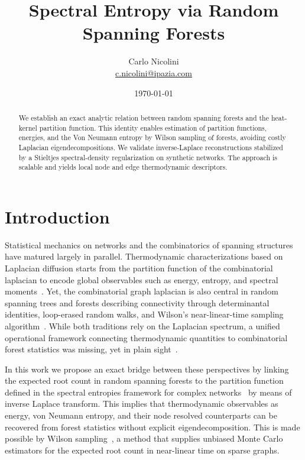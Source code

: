 \documentclass[10pt,aps,pre,twocolumn,nofootinbib,superscriptaddress,longbibliography]{revtex4-2}
\begin{document}
\title{Spectral Entropy via Random Spanning Forests}
\author{Carlo Nicolini\\\url{c.nicolini@ipazia.com}}
\date{\today}
\begin{abstract}
We establish an exact analytic relation between random spanning forests and the heat-kernel partition function. This identity enables estimation of partition functions, energies, and the Von Neumann entropy by Wilson sampling of forests, avoiding costly Laplacian eigendecompositions. We validate inverse-Laplace reconstructions stabilized by a Stieltjes spectral-density regularization on synthetic networks. The approach is scalable and yields local node and edge thermodynamic descriptors.
\end{abstract}
\maketitle

\section{Introduction}
Statistical mechanics on networks and the combinatorics of spanning structures have matured largely in parallel. 
Thermodynamic characterizations based on Laplacian diffusion starts from the partition function of the combinatorial laplacian to encode global observables such as energy, entropy, and spectral moments~\cite{chung1997,dedomenico2016b,nicolini2018}. 
Yet, the combinatorial graph laplacian is also central in random spanning trees and forests describing connectivity through determinantal identities, loop-erased random walks, and Wilson's near-linear-time sampling algorithm~\cite{wilson1996,lyons2017probability,avena2018,avena2018a}. 
While both traditions rely on the Laplacian spectrum, a unified operational framework connecting thermodynamic quantities to combinatorial forest statistics was missing, yet in plain sight~\cite{butzer1968semi}.

In this work we propose an exact bridge between these perspectives by linking the expected root count in random spanning forests to the partition function defined in the spectral entropies framework for complex networks~\cite{dedomenico2016b} by means of inverse Laplace transform.
This implies that thermodynamic observables as energy, von Neumann entropy, and their node resolved counterparts can be recovered from forest statistics without explicit eigendecomposition. 
This is made possible by Wilson sampling~\cite{propp1998,avena2018a}, a method that supplies unbiased Monte Carlo estimators for the expected root count in near-linear time on sparse graphs. 
\end{document}
